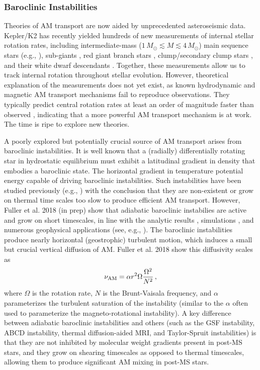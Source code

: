 \subsubsection{Baroclinic Instabilities}
\label{baroclinic}


Theories of AM transport are now aided by unprecedented asteroseismic data. Kepler/K2 has recently yielded hundreds of new measurements of internal stellar rotation rates, including intermediate-mass ($1 \, M_\odot \! \lesssim \! M \! \lesssim \! 4 \, M_\odot$) main sequence stars (e.g., \citealt{benomar:15,vanreeth:16}), sub-giants \citep{deheuvels:14}, red giant branch stars \citep{beck:12,mosser:12}, clump/secondary clump stars \citep{mosser:12,deheuvels:15}, and their white dwarf descendants \citep{hermes:17}. Together, these measurements allow us to track internal rotation throughout stellar evolution. However, theoretical explanation of the measurements does not yet exist, as known hydrodynamic and magnetic AM transport mechanisms fail to reproduce observations. They typically predict central rotation rates at least an order of magnitude faster than observed \citep{cantiello:14}, indicating that a more powerful AM transport mechanism is at work. The time is ripe to explore new theories.

A poorly explored but potentially crucial source of AM transport arises from baroclinic instabilities. It is well known that a (radially) differentially rotating star in hydrostatic equilibrium must exhibit a latitudinal gradient in density that embodies a baroclinic state. The horizontal gradient in temperature  potential energy capable of driving baroclinic instabilities. Such instabilities have been studied previously (e.g., \citealt{goldreich:67,knobloch:82,knobloch:83,spruit:83,spruit:84,zahn:93}) with the conclusion that they are non-existent or grow on thermal time scales too slow to produce efficient AM transport. However, Fuller et al. 2018 (in prep) show that adiabatic baroclinic instabilies are active and grow on short timescales, in line with the analytic results \citep{tassoul:82,fujimoto:87,fujimoto:88}, simulations \cite{simitev:17}, and numerous geophysical applications (see, e.g., \citealt{pedlosky:92}). The baroclinic instabilities produce nearly horizontal (geostrophic) turbulent motion, which induces a small but crucial vertical diffusion of AM. Fuller et al. 2018 show this diffusivity scales as
\begin{equation}
\label{numri} 
\nu_{\rm AM} = \alpha r^2 \Omega \frac{\Omega^2}{N^2} \, ,
\end{equation}
where $\Omega$ is the rotation rate, $N$ is the Brunt-Vaisala frequency, and $\alpha$ parameterizes the turbulent saturation of the instability (similar to the $\alpha$ often used to parameterize the magneto-rotational instability). A key difference between adiabatic baroclinic instabilities and others (such as the GSF instability, ABCD instability, thermal diffusion-aided MRI, and Taylor-Spruit instabilities) is that they are not inhibited by molecular weight gradients present in post-MS stars, and they grow on shearing timescales as opposed to thermal timescales, allowing them to produce significant AM mixing in post-MS stars.





